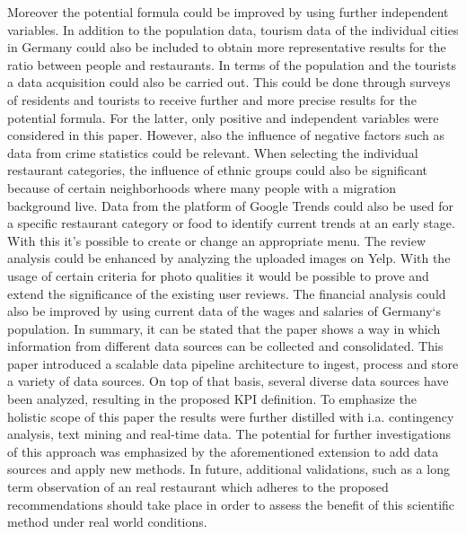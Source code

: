 Moreover the potential formula could be improved by using further independent variables. In addition to the population data, tourism data of the individual cities in Germany could also be included to obtain more representative results for the ratio between people and restaurants. In terms of the population and the tourists a data acquisition could also be carried out. This could be done through surveys of residents and tourists to receive further and more precise results for the potential formula. For the latter, only positive and independent variables were considered in this paper. However, also the influence of negative factors such as data from crime statistics could be relevant. \newline
When selecting the individual restaurant categories, the influence of ethnic groups could also be significant because of certain neighborhoods where many people with a migration background live. Data from the platform of Google Trends could also be used for a specific restaurant category or food to identify current trends at an early stage. With this it's possible to create or change an appropriate menu. \newline
The review analysis could be enhanced by analyzing the uploaded images on Yelp. With the usage of certain criteria for photo qualities it would be possible to prove and extend the significance of the existing user reviews. The financial analysis could also be improved by using current data of the wages and salaries of Germany‘s population.\newline
In summary, it can be stated that the paper shows a way in which information from different data sources can be collected and consolidated.\newline
This paper introduced a scalable data pipeline architecture to ingest, process and store a variety of data sources. On top of that basis, several diverse data sources have been analyzed, resulting in the proposed \ac{KPI} definition. To emphasize the holistic scope of this paper the results were further distilled with i.a. contingency analysis, text mining and real-time data. The potential for further investigations of this approach was emphasized by the aforementioned extension to add data sources and apply new methods.
In future, additional validations, such as a long term observation of an real restaurant which adheres to the proposed recommendations should take place in order to assess the benefit of this scientific method under real world conditions. 
